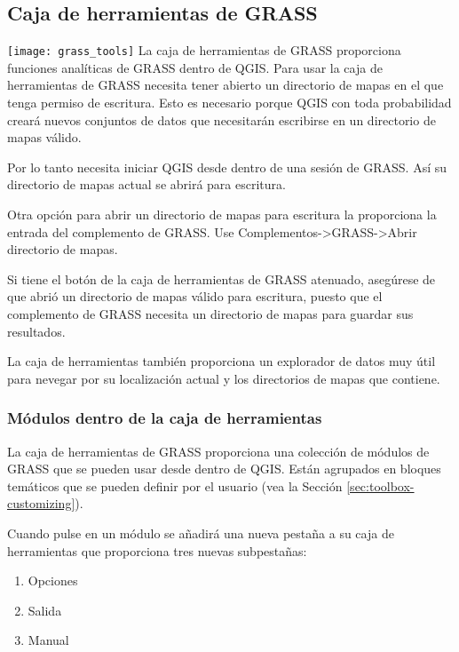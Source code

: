 \subsection{Caja de herramientas de GRASS}

\texttt{[image: grass\_tools]} La caja de herramientas de GRASS proporciona funciones analíticas de GRASS dentro de QGIS. Para usar la caja de herramientas de GRASS necesita tener abierto un directorio de mapas en el que tenga permiso de escritura. Esto es necesario porque QGIS con toda probabilidad creará nuevos conjuntos de datos que necesitarán escribirse en un directorio de mapas válido.

Por lo tanto necesita iniciar QGIS desde dentro de una sesión de GRASS. Así su  directorio de mapas actual se abrirá para escritura.

Otra opción para abrir un directorio de mapas para escritura la proporciona la entrada del complemento de GRASS. Use Complementos->GRASS->Abrir directorio de mapas.

Si tiene el botón de la caja de herramientas de GRASS atenuado, asegúrese de que abrió un directorio de mapas válido para escritura, puesto que el complemento de GRASS necesita un directorio de mapas para guardar sus resultados.

La caja de herramientas también proporciona un explorador de datos muy útil para nevegar por su localización actual y los directorios de mapas que contiene.


\subsubsection{Módulos dentro de la caja de herramientas} 

La caja de herramientas de GRASS proporciona una colección de módulos de GRASS que se pueden usar desde dentro de QGIS. Están agrupados en bloques temáticos que se pueden definir por el usuario (vea la Sección \ref{sec:toolbox-customizing}).

Cuando pulse en un módulo se añadirá una nueva pestaña a su caja de herramientas que proporciona tres nuevas subpestañas:
\begin{enumerate}
\item Opciones
\item Salida 
\item Manual
\end{enumerate}


